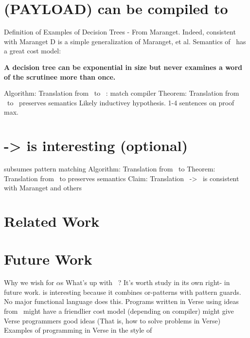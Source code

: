 \documentclass[manuscript,screen,review, 12pt]{acmart}
\begin{document}
\section{(PAYLOAD) {\VMinus} can be compiled to }
\begin{outline}[enumerate]
    \1 Definition of \D 
    \1 Examples of Decision Trees - From Maranget. 
    \2 Indeed, consistent with Maranget 
    \1 D is a simple generalization of Maranget, et al. 
    \1 Semantics of \D 
    \1 \D\ has a great cost model: 

    \bf{A decision tree can be exponential in size but never examines a word of
    the scrutinee more than once. }

    \1 Algorithm: Translation from \VMinus\ to \D\ : match compiler 
    \1 Theorem: Translation from \VMinus\ to \D\ preserves semantics 
    \2 Likely inductivey hypothesis. 1-4 sentences on proof max. 
\end{outline}

\section{\PPlus -> \VMinus is interesting (optional)}
\begin{outline}[enumerate]
    \1 \VMinus subsumes pattern matching 
    \1 Algorithm: Translation from \PPlus\ to \VMinus
    \1 Theorem: Translation from \PPlus\ to \VMinus preserves semantics 
    \1 Claim: Translation \PPlus\ -> \D\ is consistent with Maranget and others
\end{outline}

\section{Related Work}
\section{Future Work}
\begin{outline}[enumerate]
    \1 Why we wish for $\alpha$s
    \1 What's up with \PPlus\ ? It's worth study in its own right- in future work.
    \2 \PPlus is interesting because it combines or-patterns with pattern 
        guards. No major functional language does this. 
    \1 Programs written in Verse using ideas from \VMinus\ might have a 
    friendlier cost model (depending on compiler)
    \1 \VMinus might give Verse programmers good ideas 
        (That is, how to solve problems in Verse)
    \2 Examples of programming in Verse in the style of \VMinus 
\end{outline}
\end{document}
